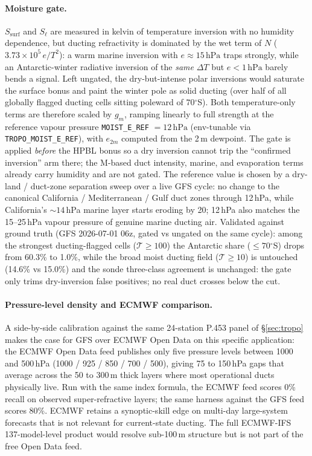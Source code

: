 \documentclass[11pt,a4paper]{article}
\newcommand{\SI}[2]{#1\,\text{#2}}
\newcommand{\degree}{\ensuremath{{}^\circ}}
\begin{document}
\paragraph{Moisture gate.}  $S_{\text{surf}}$ and $S_{\ell}$ are
measured in kelvin of temperature inversion with no humidity
dependence, but ducting refractivity is dominated by the wet term
of $N$ ($3.73\times10^{5}\,e/T^2$): a warm marine inversion with
$e \approx \SI{15}{hPa}$ traps strongly, while an
Antarctic-winter radiative inversion of the \emph{same}
$\Delta T$ but $e < \SI{1}{hPa}$ barely bends a signal.  Left
ungated, the dry-but-intense polar inversions would saturate the
surface bonus and paint the winter pole as solid ducting (over
half of all globally flagged ducting cells sitting poleward of
$70\degree$S).  Both temperature-only terms are therefore scaled
by $g_m$, ramping linearly to full strength at the reference
vapour pressure \texttt{MOIST\_E\_REF} $= \SI{12}{hPa}$
(env-tunable via \texttt{TROPO\_MOIST\_E\_REF}), with $e_{2m}$
computed from the 2\,m dewpoint.  The gate is applied
\emph{before} the HPBL bonus so a dry inversion cannot trip the
``confirmed inversion'' arm there; the M-based duct intensity,
marine, and evaporation terms already carry humidity and are not
gated.  The reference value is chosen by a dry-land /
duct-zone separation sweep over a live GFS cycle: no change to
the canonical California / Mediterranean / Gulf duct zones
through 12\,hPa, while California's ${\sim}14$\,hPa marine layer
starts eroding by 20; 12\,hPa also matches the 15--25\,hPa
vapour pressure of genuine marine ducting air.  Validated
against ground truth (GFS 2026-07-01 06z, gated vs ungated on
the same cycle): among the strongest ducting-flagged cells
($\mathcal{T} \ge 100$) the Antarctic share ($\le 70\degree$S)
drops from 60.3\% to 1.0\%, while the broad moist ducting field
($\mathcal{T} \ge 10$) is untouched (14.6\% vs 15.0\%) and the
sonde three-class agreement is unchanged: the gate only trims
dry-inversion false positives; no real duct crosses below the
cut.

\paragraph{Pressure-level density and ECMWF comparison.} A
side-by-side calibration against the same 24-station P.453 panel
of \S\ref{sec:tropo} makes the case for GFS over ECMWF Open Data on
this specific application: the ECMWF Open Data feed publishes only
five pressure levels between 1000 and 500\,hPa
(1000 / 925 / 850 / 700 / 500), giving 75 to 150\,hPa gaps that
average across the 50 to 300\,m thick layers where most operational
ducts physically live.  Run with the same index formula, the ECMWF
feed scores 0\% recall on observed super-refractive layers; the
same harness against the GFS feed scores 80\%.  ECMWF retains a
synoptic-skill edge on multi-day large-system forecasts that is
not relevant for current-state ducting.  The full ECMWF-IFS
137-model-level product would resolve sub-100\,m structure but is
not part of the free Open Data feed.
\end{document}
